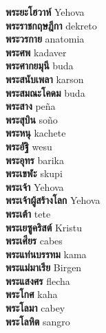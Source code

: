\textbf{ พระยะโฮวาห์  } Yehova \\
\textbf{ พระราชกฤษฎีกา  } dekreto \\
\textbf{ พระวรกาย  } anatomia \\
\textbf{ พระศพ  } kadaver \\
\textbf{ พระศากยมุนี  } buda \\
\textbf{ พระสนับเพลา  } karson \\
\textbf{ พระสมณะโคดม  } buda \\
\textbf{ พระสาง  } peña \\
\textbf{ พระสุบิน  } soño \\
\textbf{ พระหนุ  } kachete \\
\textbf{ พระอัฐิ  } wesu \\
\textbf{ พระอุทร  } barika \\
\textbf{ พระเขฬะ  } skupi \\
\textbf{ พระเจ้า  } Yehova \\
\textbf{ พระเจ้าผู้สร้างโลก  } Yehova \\
\textbf{ พระเต้า  } tete \\
\textbf{ พระเยซูคริสต์  } Kristu \\
\textbf{ พระเศียร  } cabes \\
\textbf{ พระแท่นบรรทม  } kama \\
\textbf{ พระแม่มาเรีย  } Birgen \\
\textbf{ พระแสงศร  } flecha \\
\textbf{ พระโกศ  } kaha \\
\textbf{ พระโลมา  } cabey \\
\textbf{ พระโลหิต  } sangro \\
